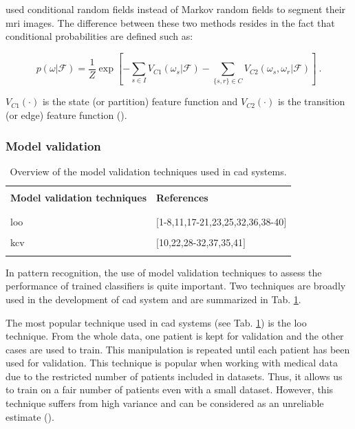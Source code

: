 \begin{enumerate}[leftmargin=*]
\cite{Artan2009,Artan2010} used conditional random fields instead of Markov random fields to segment their \ac{mri} images. The difference between these two methods resides in the fact that conditional probabilities are defined such as:

\begin{equation}
	p(\omega|\mathcal{F}) =  \frac{1}{Z} \exp \left[ - \sum_{s \in I} V_{C1}(\omega_s|\mathcal{F}) - \sum_{\{s,r\} \in C } V_{C2} (\omega_s,\omega_r|\mathcal{F})  \right] \ .
\label{eq:crf}
\end{equation}

\noindent $V_{C1}(\cdot)$ is the state (or partition) feature function and $V_{C2}(\cdot)$ is the transition (or edge) feature function (\cite{Kato2012}).

\end{enumerate}

\subsubsection{Model validation}

\begin{table}
	\caption{Overview of the model validation techniques used in \ac{cad} systems.}
	\small
	\begin{tabular}{p{.55\linewidth} p{.35\linewidth}}
		\hline \\ [-1.5ex]
		\textbf{Model validation techniques} & \textbf{References} \\ \\ [-1.5ex]
		\hline \\ [-1.5ex]
		\quad \acs{loo} & $[$1-8,11,17-21,23,25,32,36,38-40$]$ \\ \\ [-1.5ex]
		\quad \acs{kcv} & $[$10,22,28-32,37,35,41$]$ \\ \\ [-1.5ex]
		\hline
	\end{tabular}
	\label{tab:valmod}
\end{table}

In pattern recognition, the use of model validation techniques to assess the performance of trained classifiers is quite important. Two techniques are broadly used in the development of \ac{cad} system and are summarized in Tab. \ref{tab:valmod}.

The most popular technique used in \ac{cad} systems (see Tab. \ref{tab:valmod}) is the \acf{loo} technique. From the whole data, one patient is kept for validation and the other cases are used to train. This manipulation is repeated until each patient has been used for validation. This technique is popular when working with medical data due to the restricted number of patients included in datasets. Thus, it allows us to train on a fair number of patients even with a small dataset. However, this technique suffers from high variance and can be considered as an unreliable estimate (\cite{Efron1983}).

